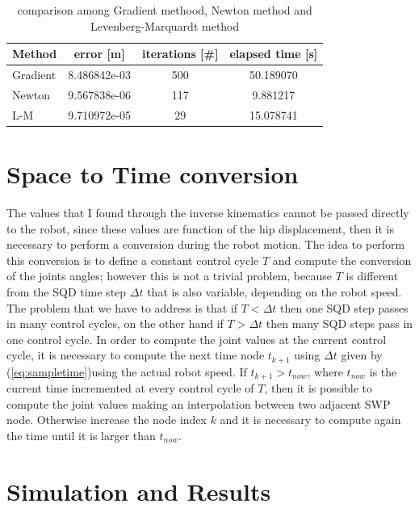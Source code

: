 \documentclass[a4paper]{article}
\begin{document}
\begin{table}[H]
\centering
\begin{tabular}{|l|c|c|c|}
\hline
Method          & error [m]       &  iterations [\#] & elapsed time [s]    \\
\hline
Gradient      & 8.486842e-03     & 500   &   50.189070     \\
Newton        & 9.567838e-06     & 117   &   9.881217     \\
L-M           & 9.710972e-05   & 29    & 15.078741       \\
\hline
\end{tabular}
\caption{comparison among Gradient methood, Newton method and Levenberg-Marquardt method}
\label{tab:comparison}
\end{table}

\section{Space to Time conversion}

The values that I found through the inverse kinematics cannot be passed directly to the robot, since these values are function of the hip displacement, then it is necessary to perform a  conversion during the robot motion. The idea to perform this conversion is to define a constant control cycle  $T$ and compute the conversion of the joints angles; however this is not a trivial problem, because $T$ is different from the SQD time step $\Delta t$ that is also variable, depending on the robot speed. The problem that we have to address is that if $T<\Delta t$ then one SQD step passes in many control cycles, on the other hand if $T>\Delta t$ then many SQD steps pass in one control cycle. In order to compute the joint values at the current control cycle, it is necessary to compute the next time node $t_{k+1}$ using $\Delta t$ given by (\ref{eq:sampletime})using the actual robot speed. If $t_{k+1}>t_{now}$, where $t_{now}$ is the current time incremented at every control cycle of $T$, then it is possible to compute the joint values making an interpolation between two adjacent SWP node. Otherwise increase the node index $k$ and it is necessary to compute again the time until it is larger than $t_{now}$.

\newpage

\section{Simulation and Results}
\end{document}
